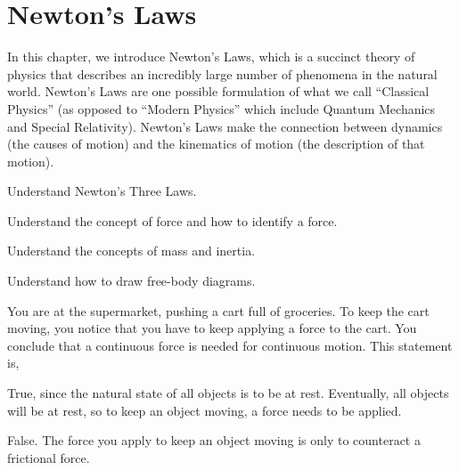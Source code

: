 
\chapter{Newton's Laws}
\label{chap:NewtonsLaws}

In this chapter, we introduce Newton's Laws, which is a succinct theory of physics that describes an incredibly large number of phenomena in the natural world. Newton's Laws are one possible formulation of what we call ``Classical Physics'' (as opposed to ``Modern Physics'' which include Quantum Mechanics and Special Relativity). Newton's Laws make the connection between dynamics (the causes of motion) and the kinematics of motion (the description of that motion). 

\begin{learningObjectives}
{
\item Understand Newton's Three Laws.
\item Understand the concept of force and how to identify a force.
\item Understand the concepts of mass and inertia.
\item Understand how to draw free-body diagrams.
}
\end{learningObjectives}

\begin{opening}
\begin{MCquestion}{You are at the supermarket, pushing a cart full of groceries. To keep the cart moving, you notice that you have to keep applying a force to the cart. You conclude that a continuous force is needed for continuous motion. This statement is,}
\item True, since the natural state of all objects is to be at rest. Eventually, all objects will be at rest, so to keep an object moving, a force needs to be applied.
\item False. The force you apply to keep an object moving is only to counteract a frictional force.
\end{MCquestion}
\end{opening}
